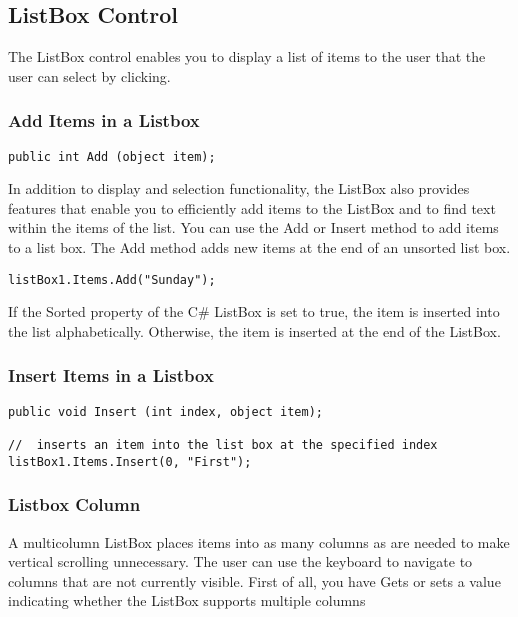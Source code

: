 \subsection{ListBox Control}
The ListBox control enables you to display a list of items to the user that the user can select by clicking.

\subsubsection{Add Items in a Listbox}
\begin{lstlisting}[numbers=none]
public int Add (object item);
\end{lstlisting}

In addition to display and selection functionality, the ListBox also provides features that enable you to efficiently add items to the ListBox and to find text within the items of the list. You can use the Add or Insert method to add items to a list box. The Add method adds new items at the end of an unsorted list box.

\begin{lstlisting}[numbers=none]
listBox1.Items.Add("Sunday");
\end{lstlisting}

If the Sorted property of the C\# ListBox is set to true, the item is inserted into the list alphabetically. Otherwise, the item is inserted at the end of the ListBox.

\subsubsection*{Insert Items in a Listbox}

\begin{lstlisting}[numbers=none]
public void Insert (int index, object item);

//  inserts an item into the list box at the specified index
listBox1.Items.Insert(0, "First");
\end{lstlisting}

\subsubsection*{Listbox Column}
A multicolumn ListBox places items into as many columns as are needed to make vertical scrolling unnecessary. The user can use the keyboard to navigate to columns that are not currently visible. First of all, you have Gets or sets a value indicating whether the ListBox supports multiple columns 

